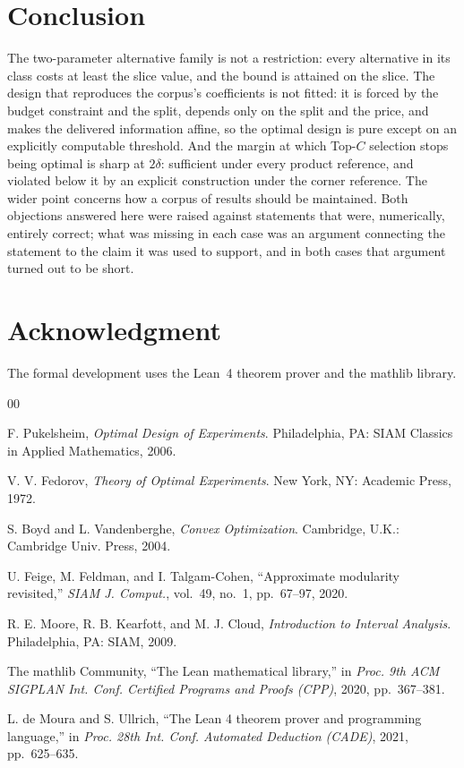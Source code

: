 \documentclass[conference]{IEEEtran}
\theoremstyle{definition}
\begin{document}
\section{Conclusion}

The two-parameter alternative family is not a restriction: every alternative in its class
costs at least the slice value, and the bound is attained on the slice. The design
that reproduces the corpus's coefficients is not fitted: it is forced by the budget constraint
and the split, depends only on the split and the price, and makes the delivered information
affine, so the optimal design is pure except on an explicitly computable threshold. And the
margin at which Top-$C$ selection stops being optimal is sharp at $2\delta$: sufficient under
every product reference, and violated below it by an explicit construction under the corner
reference. The wider point concerns how a corpus of results should be maintained. Both
objections answered here were raised against statements that were, numerically, entirely
correct; what was missing in each case was an argument connecting the statement to the claim
it was used to support, and in both cases that argument turned out to be short.

\section*{Acknowledgment}

The formal development uses the Lean~4 theorem prover and the mathlib library.

\begin{thebibliography}{00}

 F. Pukelsheim, \emph{Optimal Design of Experiments}. Philadelphia,
PA: SIAM Classics in Applied Mathematics, 2006.

 V. V. Fedorov, \emph{Theory of Optimal Experiments}. New York, NY:
Academic Press, 1972.

 S. Boyd and L. Vandenberghe, \emph{Convex Optimization}. Cambridge,
U.K.: Cambridge Univ. Press, 2004.

 U. Feige, M. Feldman, and I. Talgam-Cohen, ``Approximate modularity
revisited,'' \emph{SIAM J. Comput.}, vol.~49, no.~1, pp.~67--97, 2020.

 R. E. Moore, R. B. Kearfott, and M. J. Cloud, \emph{Introduction to
Interval Analysis}. Philadelphia, PA: SIAM, 2009.

 The mathlib Community, ``The Lean mathematical library,'' in
\emph{Proc. 9th ACM SIGPLAN Int. Conf. Certified Programs and Proofs (CPP)}, 2020,
pp.~367--381.

 L. de Moura and S. Ullrich, ``The Lean 4 theorem prover and
programming language,'' in \emph{Proc. 28th Int. Conf. Automated Deduction (CADE)}, 2021,
pp.~625--635.

\end{thebibliography}


\end{document}
